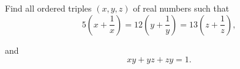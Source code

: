 Find all ordered triples $ (x, y, z)$ of real numbers such that\[ 5 \left(x +  \frac{1}{x} \right) = 12 \left(y +  \frac{1}{y} \right) = 13 \left(z +  \frac{1}{z} \right),\]

and \[ xy + yz + zy = 1.\]
